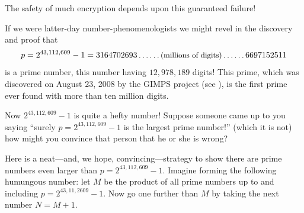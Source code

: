 \documentclass[openany]{book}
\theoremstyle{plain}
\theoremstyle{definition}
\begin{document}




The safety of much
encryption depends upon this guaranteed failure! 

If we were latter-day number-phenomenologists we might revel in the
discovery and proof that
$$
  p=2^{43,112,609}-1 = 3164702693\ldots\ldots\text{\small (millions of digits)}\ldots\ldots6697152511
$$
is a prime number, this number having $12{,}978{,}189$ digits!  This
prime, which was discovered on August 23, 2008 by the GIMPS project
(see ),
is the first prime ever found with more than ten million digits.

Now $2^{43,112,609}-1$ is quite a hefty number! Suppose someone came
up to you saying ``surely $p = 2^{43,112,609}-1$ is the largest prime
number!'' (which it is not) how might you convince that person that
he or she is wrong?


Here is a neat---and, we hope, convincing---strategy to show there are
prime numbers even larger than $p = 2^{43,112,609} - 1$. Imagine
forming the following humungous number: let $M$ be the product of all
prime numbers up to and including $p = 2^{43,11,2609} - 1$.  Now go
one further than $M$ by taking the next number $N=M+1$.
\end{document}
